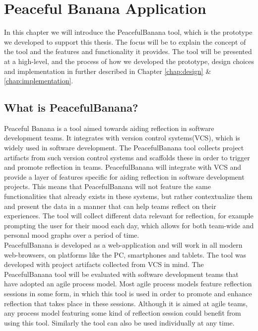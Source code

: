 \chapter{Peaceful Banana Application}
\label{peacefulBananaApplication}
In this chapter we will introduce the PeacefulBanana tool, which is the prototype we developed to support this thesis. The focus will be to explain the concept of the tool and the features and functionality it provides. The tool will be presented at a high-level, and the process of how we developed the prototype, design choices and implementation in further described in Chapter \ref{chap:design} \& \ref{chap:implementation}.
\section{What is PeacefulBanana?}
Peaceful Banana is a tool aimed towards aiding reflection in software development teams. It integrates with version control systems(VCS), which is widely used in software development. The PeacefulBanana tool collects project artifacts from such version control systems and scaffolds these in order to trigger and promote reflection in teams. PeacefulBanana will integrate with VCS and provide a layer of features specific for aiding reflection in software development projects. This means that PeacefulBanana will not feature the same functionalities that already exists in these systems, but rather contextualize them and present the data in a manner that can help teams reflect on their experiences. The tool will collect different data relevant for reflection, for example prompting the user for their mood each day, which allows for both team-wide and personal mood graphs over a period of time. \\
PeacefulBanana is developed as a web-application and will work in all modern web-browsers, on platforms like the PC, smartphones and tablets.
The tool was developed with project artifacts collected from VCS in mind. The PeacefulBanana tool will be evaluated with software development teams that have adopted an agile process model. Most agile process models feature reflection sessions in some form, in which this tool is used in order to promote and enhance reflection that takes place in these sessions. Although it is aimed at agile teams, any process model featuring some kind of reflection session could benefit from using this tool. Similarly the tool can also be used individually at any time. 

